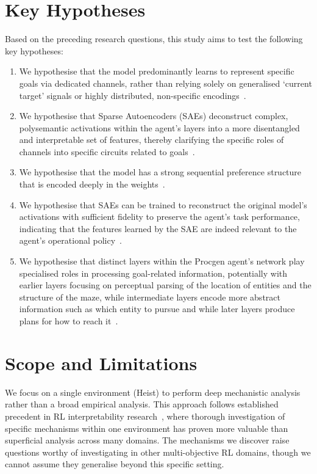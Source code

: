 \section{Key Hypotheses}\label{sec:hypotheses}
Based on the preceding research questions, this study aims to test the following key hypotheses:
\begin{enumerate}
    \item[\textbf{H1:}] We hypothesise that the model predominantly learns to represent specific goals via dedicated channels, rather than relying solely on generalised `current target' signals or highly distributed, non-specific encodings~\citep{bau_2017_network, cammarata2020curve}.
    \item[\textbf{H2:}] We hypothesise that Sparse Autoencoders (SAEs) deconstruct complex, polysemantic activations within the agent's layers into a more disentangled and interpretable set of features, thereby clarifying the specific roles of channels into specific circuits related to goals~\citep{bricken2023monosemanticity}.
    \item[\textbf{H3:}] We hypothesise that the model has a strong sequential preference structure that is encoded deeply in the weights~\citep{langosco2022goal}.
    \item[\textbf{H4:}] We hypothesise that SAEs can be trained to reconstruct the original model's activations with sufficient fidelity to preserve the agent's task performance, indicating that the features learned by the SAE are indeed relevant to the agent's operational policy~\citep{templeton_scaling_2024, bricken2023monosemanticity}.
    \item[\textbf{H5:}] We hypothesise that distinct layers within the Procgen agent's network play specialised roles in processing goal-related information, potentially with earlier layers focusing on perceptual parsing of the location of entities and the structure of the maze, while intermediate layers encode more abstract information such as which entity to pursue and while later layers produce plans for how to reach it~\citep{zeiler_2013_visualizing, bau_2017_network, trim_2024_mechanistic}.
\end{enumerate}


\section{Scope and Limitations}\label{sec:scope}
We focus on a single environment (Heist) to perform deep mechanistic analysis rather than a broad empirical analysis. This approach follows established precedent in RL interpretability research~\citep{mini_2023_understanding,hilton_2020_understanding, trim_2024_mechanistic}, where thorough investigation of specific mechanisms within one environment has proven more valuable than superficial analysis across many domains. The mechanisms we discover raise questions worthy of investigating in other multi-objective RL domains, though we cannot assume they generalise beyond this specific setting.

